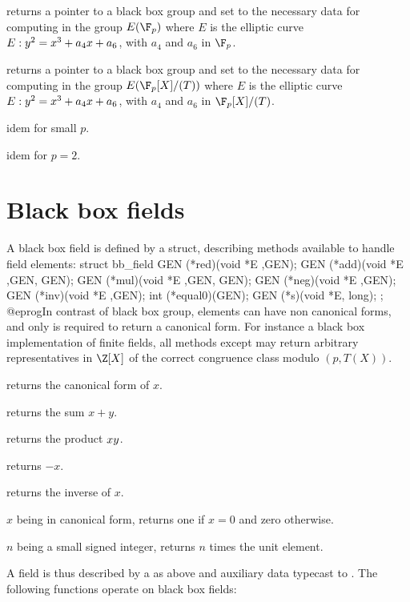 returns a pointer to a black box group and set  to the necessary data for
computing in the group $E(\F_p)$ where $E$ is the elliptic curve $E:y^2=x^3+a_4\*x+a_6$,
with $a_4$ and $a_6$ in $\F_p$.

returns a pointer to a black box group and set  to the necessary data for
computing in the group $E(\F_p[X]/(T))$ where $E$ is the elliptic curve $E:y^2=x^3+a_4\*x+a_6$,
with $a_4$ and $a_6$ in $\F_p[X]/(T)$.

 idem for small $p$.

idem for $p=2$.

\section{Black box fields}

A black box field is defined by a  struct, describing methods
available to handle field elements:
\bprog
  struct bb_field
  {
    GEN (*red)(void *E ,GEN);
    GEN (*add)(void *E ,GEN, GEN);
    GEN (*mul)(void *E ,GEN, GEN);
    GEN (*neg)(void *E ,GEN);
    GEN (*inv)(void *E ,GEN);
    int (*equal0)(GEN);
    GEN (*s)(void *E, long);
  };
@eprog\noindent In contrast of black box group, elements can have
non canonical forms, and only  is required to return a canonical form.
For instance a black box implementation of finite fields, all methods
except  may return arbitrary representatives in $\Z[X]$ of the
correct congruence class modulo $(p,T(X))$.

 returns the canonical form of $x$.

 returns the sum $x+y$.

 returns the product $x\*y$.

 returns $-x$.

 returns the inverse of $x$.

 $x$ being in canonical form, returns one if $x=0$ and zero
otherwise.

 $n$ being a small signed integer, returns $n$ times the unit element.

\noindent A field is thus described by a  as above and
auxiliary data typecast to . The following functions operate on
black box fields:

